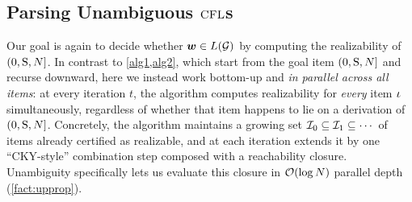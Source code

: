 \documentclass{article}
\begin{document}
\subsection{Parsing Unambiguous ${\textsc{CFL}}$s}\label{subsec:unambiguousalgo}
Our goal is again to decide whether ${{\boldsymbol{w}}} \in {L}({{ \mathcal{G}}})$ by computing the realizability of $(0, {{ \mathrm{S}}}, {{ N}}]$.
In contrast to \cref{alg1,alg2}, which start from the goal item $(0, {{ \mathrm{S}}}, {{ N}}]$ and recurse downward, here we instead work bottom-up and \emph{in parallel across all items}: at every iteration $t$, the algorithm computes realizability for \emph{every} item ${{ \iota}}$ simultaneously, regardless of whether that item happens to lie on a derivation of $(0, {{ \mathrm{S}}}, {{ N}}]$.
Concretely, the algorithm maintains a growing set ${{\mathcal{I}}}_0 \subseteq {{\mathcal{I}}}_1 \subseteq \cdots$ of items already certified as realizable, and at each iteration extends it by one ``CKY-style'' combination step composed with a reachability closure.
Unambiguity specifically lets us evaluate this closure in ${{ \mathcal{O}}}(\log {{ N}})$ parallel depth (\cref{fact:upprop}).
\end{document}
